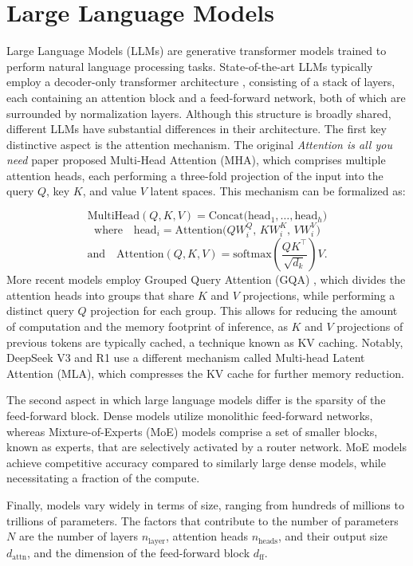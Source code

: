 \section{Large Language Models}
\label{chap:background:sec:llms}

Large Language Models (LLMs) are generative transformer models trained to perform natural language processing tasks.
State-of-the-art LLMs typically employ a decoder-only transformer architecture \cite{radford2018improving}, consisting of a stack of layers, each containing an attention block \cite{attention_is_all_you_need} and a feed-forward network, both of which are surrounded by normalization layers.
Although this structure is broadly shared, different LLMs have substantial differences in their architecture.
The first key distinctive aspect is the attention mechanism. The original \textit{Attention is all you need} paper \cite{attention_is_all_you_need} proposed Multi-Head Attention (MHA), which comprises multiple attention heads, each performing a three-fold projection of the input into the query $Q$, key $K$, and value $V$ latent spaces. 
This mechanism can be formalized as: 

\[
\text{MultiHead}(Q, K, V) = \text{Concat}\big(\text{head}_1, \ldots, \text{head}_h\big)
\]
\[
\text{where} \quad \text{head}_i = \text{Attention}\big(Q W_i^Q,\, K W_i^K,\, V W_i^V\big)
\]
\[
\text{and} \quad \text{Attention}(Q, K, V) = \text{softmax}\!\left(\frac{Q K^\top}{\sqrt{d_k}}\right) V.
\]
More recent models employ Grouped Query Attention (GQA) \cite{ainslie2023gqa}, which divides the attention heads into groups that share $K$ and $V$ projections, while performing a distinct query $Q$ projection for each group. This allows for reducing the amount of computation and the memory footprint of inference, as $K$ and $V$ projections of previous tokens are typically cached, a technique known as KV caching. Notably, DeepSeek V3 and R1 \cite{liu2024deepseek, guo2025deepseek} use a different mechanism called Multi-head Latent Attention (MLA), which compresses the KV cache for further memory reduction.

The second aspect in which large language models differ is the sparsity of the feed-forward block. Dense models utilize monolithic feed-forward networks, whereas Mixture-of-Experts (MoE) \cite{artetxe2021efficient} models comprise a set of smaller blocks, known as experts, that are selectively activated by a router network. MoE models achieve competitive accuracy compared to similarly large dense models, while necessitating a fraction of the compute.

Finally, models vary widely in terms of size, ranging from hundreds of millions to trillions of parameters. The factors that contribute to the number of parameters $N$ are the number of layers $n_\text{layer}$, attention heads $n_\text{heads}$, and their output size $d_{\text{attn}}$, and the dimension of the feed-forward block $d_{\text{ff}}$.
